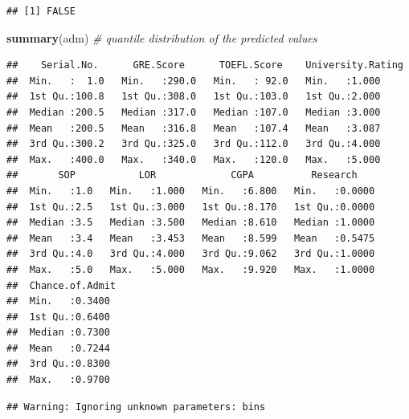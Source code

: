 \documentclass[11pt,]{article}
\newenvironment{Shaded}{\begin{snugshade}}{\end{snugshade}}
\newcommand{\CommentTok}[1]{\textcolor[rgb]{0.56,0.35,0.01}{\textit{#1}}}
\newcommand{\DataTypeTok}[1]{\textcolor[rgb]{0.13,0.29,0.53}{#1}}
\newcommand{\DecValTok}[1]{\textcolor[rgb]{0.00,0.00,0.81}{#1}}
\newcommand{\KeywordTok}[1]{\textcolor[rgb]{0.13,0.29,0.53}{\textbf{#1}}}
\newcommand{\NormalTok}[1]{#1}
\newcommand{\OperatorTok}[1]{\textcolor[rgb]{0.81,0.36,0.00}{\textbf{#1}}}
\newcommand{\StringTok}[1]{\textcolor[rgb]{0.31,0.60,0.02}{#1}}
\begin{document}
\begin{verbatim}
## [1] FALSE
\end{verbatim}

\begin{Shaded}
\begin{Highlighting}[]
\KeywordTok{summary}\NormalTok{(adm) }\CommentTok{# quantile distribution of the predicted values}
\end{Highlighting}
\end{Shaded}

\begin{verbatim}
##    Serial.No.      GRE.Score      TOEFL.Score    University.Rating
##  Min.   :  1.0   Min.   :290.0   Min.   : 92.0   Min.   :1.000    
##  1st Qu.:100.8   1st Qu.:308.0   1st Qu.:103.0   1st Qu.:2.000    
##  Median :200.5   Median :317.0   Median :107.0   Median :3.000    
##  Mean   :200.5   Mean   :316.8   Mean   :107.4   Mean   :3.087    
##  3rd Qu.:300.2   3rd Qu.:325.0   3rd Qu.:112.0   3rd Qu.:4.000    
##  Max.   :400.0   Max.   :340.0   Max.   :120.0   Max.   :5.000    
##       SOP           LOR             CGPA          Research     
##  Min.   :1.0   Min.   :1.000   Min.   :6.800   Min.   :0.0000  
##  1st Qu.:2.5   1st Qu.:3.000   1st Qu.:8.170   1st Qu.:0.0000  
##  Median :3.5   Median :3.500   Median :8.610   Median :1.0000  
##  Mean   :3.4   Mean   :3.453   Mean   :8.599   Mean   :0.5475  
##  3rd Qu.:4.0   3rd Qu.:4.000   3rd Qu.:9.062   3rd Qu.:1.0000  
##  Max.   :5.0   Max.   :5.000   Max.   :9.920   Max.   :1.0000  
##  Chance.of.Admit 
##  Min.   :0.3400  
##  1st Qu.:0.6400  
##  Median :0.7300  
##  Mean   :0.7244  
##  3rd Qu.:0.8300  
##  Max.   :0.9700
\end{verbatim}

\begin{Shaded}
\end{Shaded}

\begin{verbatim}
## Warning: Ignoring unknown parameters: bins
\end{verbatim}
\end{document}
